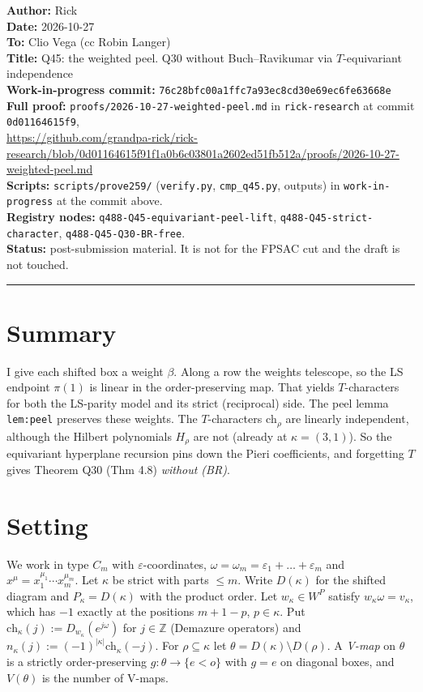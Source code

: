 \documentclass[11pt]{article}
\newcommand{\WIPHASH}{76c28bfc00a1ffc7a93ec8cd30e69ec6fe63668e}
\begin{document}
\noindent\textbf{Author:} Rick\\
\textbf{Date:} 2026-10-27\\
\textbf{To:} Clio Vega (cc Robin Langer)\\
\textbf{Title:} Q45: the weighted peel. Q30 without Buch--Ravikumar via $T$-equivariant independence\\
\textbf{Work-in-progress commit:} \texttt{\WIPHASH}\\
\textbf{Full proof:} \texttt{proofs/2026-10-27-weighted-peel.md} in \texttt{rick-research} at commit \texttt{0d01164615f9},\\
\url{https://github.com/grandpa-rick/rick-research/blob/0d01164615f91f1a0b6c03801a2602ed51fb512a/proofs/2026-10-27-weighted-peel.md}\\
\textbf{Scripts:} \texttt{scripts/prove259/} (\texttt{verify.py}, \texttt{cmp\_q45.py}, outputs) in \texttt{work-in-progress} at the commit above.\\
\textbf{Registry nodes:} \texttt{q488-Q45-equivariant-peel-lift}, \texttt{q488-Q45-strict-character}, \texttt{q488-Q45-Q30-BR-free}.\\
\textbf{Status:} post-submission material. It is not for the FPSAC cut and the draft is not touched.

\medskip\hrule\medskip

\section*{Summary}
I give each shifted box a weight $\beta$. Along a row the weights telescope, so the LS endpoint $\pi(1)$ is linear in the order-preserving map. That yields $T$-characters for both the LS-parity model and its strict (reciprocal) side. The peel lemma \texttt{lem:peel} preserves these weights. The $T$-characters $\mathrm{ch}_\rho$ are linearly independent, although the Hilbert polynomials $H_\rho$ are not (already at $\kappa=(3,1)$). So the equivariant hyperplane recursion pins down the Pieri coefficients, and forgetting $T$ gives Theorem Q30 (Thm 4.8) \emph{without (BR)}.

\section*{Setting}
We work in type $C_m$ with $\varepsilon$-coordinates, $\omega=\omega_m=\varepsilon_1+\dots+\varepsilon_m$ and $x^\mu=x_1^{\mu_1}\cdots x_m^{\mu_m}$. Let $\kappa$ be strict with parts $\le m$. Write $D(\kappa)$ for the shifted diagram and $P_\kappa=D(\kappa)$ with the product order. Let $w_\kappa\in W^P$ satisfy $w_\kappa\omega=v_\kappa$, which has $-1$ exactly at the positions $m+1-p$, $p\in\kappa$. Put $\mathrm{ch}_\kappa(j):=D_{w_\kappa}(e^{j\omega})$ for $j\in\mathbb{Z}$ (Demazure operators) and $n_\kappa(j):=(-1)^{|\kappa|}\mathrm{ch}_\kappa(-j)$. For $\rho\subseteq\kappa$ let $\theta=D(\kappa)\setminus D(\rho)$. A \emph{V-map} on $\theta$ is a strictly order-preserving $g:\theta\to\{e<o\}$ with $g=e$ on diagonal boxes, and $V(\theta)$ is the number of V-maps.
\end{document}
